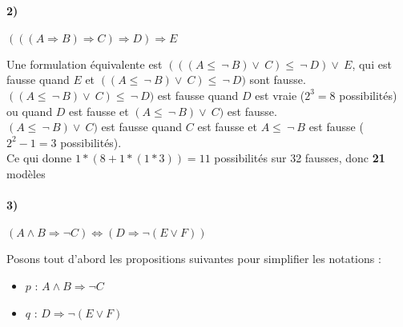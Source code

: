    \paragraph{2)} $(((A \Rightarrow B) \Rightarrow C) \Rightarrow D) \Rightarrow E$
    
    
    Une formulation équivalente est $(((A \leq\ \neg\ B) \lor\ C) \leq\ \neg\ D) \lor\ E$, qui est fausse quand $E$ et $((A \leq\ \neg\ B) \lor\ C) \leq\ \neg\ D)$ sont fausse. \\
    $((A \leq\ \neg\ B) \lor\ C) \leq\ \neg\ D)$ est fausse quand $D$ est vraie ($2^3 = 8$ possibilités) ou quand $D$ est fausse et $(A \leq\ \neg\ B) \lor\ C)$ est fausse. \\
    $(A \leq\ \neg\ B) \lor\ C)$ est fausse quand $C$ est fausse et $A \leq\ \neg\ B$ est fausse ($2^2 - 1 = 3$ possibilités).\\
    Ce qui donne $1* (8 + 1 * (1 * 3)) = 11$ possibilités sur 32 fausses, donc \textbf{21} modèles
    
    
    \paragraph{3)} $(A \land B \Rightarrow \neg C) \Leftrightarrow (D \Rightarrow \neg(E \lor F))$
    
    Posons tout d'abord les propositions suivantes pour simplifier les notations :
    \begin{itemize}
        \item $p$ : $A \land B \Rightarrow \neg C$
        \item $q$ : $D \Rightarrow \neg(E \lor F)$
    \end{itemize}
    
